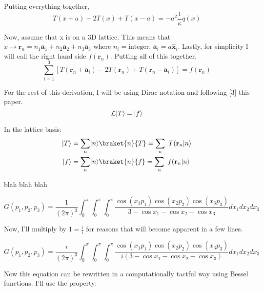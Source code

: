 \documentclass[12pt]{article}
\DeclarePairedDelimiter\ket{\lvert}{\rangle}
\begin{document}
Putting everything together, 
\begin{equation}
T(x + a) - 2 T(x) + T(x - a) = - a^2 \frac{1}{\kappa} q(x)
\end{equation}

Now, assume that x is on a 3D lattice. This means that $x \rightarrow \textbf{r}_n = n_1 \textbf{a}_1 + n_2 \textbf{a}_2 + n_3 \textbf{a}_3 $ where $n_i = \textrm{integer}$, $\textbf{a}_i = a \hat{\textbf{x}}_i$. Lastly, for simplicity I will call the right hand side $f(\textbf{r}_n)$. Putting all of this together, 
\begin{equation}
\sum_{i=1}^3 \left [ T(\textbf{r}_n + \textbf{a}_i)  - 2T(\textbf{r}_n) + T(\textbf{r}_n - \textbf{a}_i) \right ] = f (\textbf{r}_n)
\end{equation}

For the rest of this derivation, I will be using Dirac notation and following [3] this paper. 
\begin{equation}
\mathcal{L} \ket{T} = \ket{f}
\end{equation}

In the lattice basis:
\begin{equation}
\begin{split}
\ket{T} &= \sum_n \ket{n} \braket{n}{T} = \sum_n \ T(\textbf{r}_n \ket{n} \\
\ket{f} &= \sum_n \ket{n} \braket{n}{f} = \sum_n \ f(\textbf{r}_n \ket{n}
\end{split}
\end{equation}

blah blah blah 

\begin{equation}
G(p_1, p_2, p_3) = \frac{1}{(2 \pi )^3} \int_0^\pi \int_0^\pi \int_0^\pi \frac{\cos(x_1 p_1) \cos(x_2 p_2) \cos(x_3 p_3)}{3 - \cos x_1 -  \cos x_2 - \cos x_3} dx_1 dx_2 dx_3 
\end{equation}

Now, I'll multiply by $1 = \frac{i}{i}$  for reasons that will become apparent in a few lines. 

\begin{equation}
G(p_1, p_2, p_3) = \frac{i}{(2 \pi )^3} \int_0^\pi \int_0^\pi \int_0^\pi \frac{\cos(x_1 p_1) \cos(x_2 p_2) \cos(x_3 p_3)}{i(3 - \cos x_1 -  \cos x_2 - \cos x_3)} dx_1 dx_2 dx_3 
\end{equation}

Now this equation can be rewritten in a computationally tactful way using Bessel functions. I'll use the property: 
\end{document}
